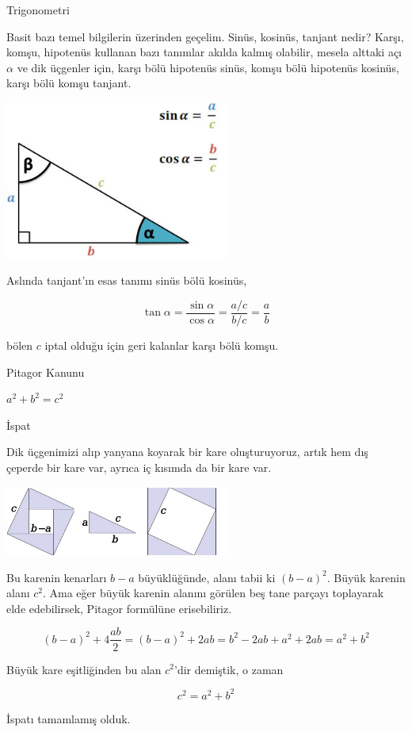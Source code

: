 \documentclass[12pt,fleqn]{article}\usepackage{../../common}
\begin{document}
Trigonometri

Basit bazı temel bilgilerin üzerinden geçelim. Sinüs, kosinüs, tanjant nedir?
Karşı, komşu, hipotenüs kullanan bazı tanımlar akılda kalmış olabilir, mesela
alttaki açı $\alpha$ ve dik üçgenler için, karşı bölü hipotenüs sinüs, komşu
bölü hipotenüs kosinüs, karşı bölü komşu tanjant.

\includegraphics[width=20em]{ode_mattuck_50_trig_04.jpg}

Aslında tanjant'ın esas tanımı sinüs bölü kosinüs,

$$
\tan \alpha = \frac{\sin\alpha}{\cos\alpha} = \frac{a / c}{b / c} = \frac{a}{b}
$$

bölen $c$ iptal olduğu için geri kalanlar karşı bölü komşu. 

Pitagor Kanunu

$a^2 + b^2 = c^2$

İspat

Dik üçgenimizi alıp yanyana koyarak bir kare oluşturuyoruz, artık hem dış
çeperde bir kare var, ayrıca iç kısımda da bir kare var. 

\includegraphics[width=20em]{ode_mattuck_50_trig_01.png}

Bu karenin kenarları $b-a$ büyüklüğünde, alanı tabii ki $(b-a)^2$. Büyük karenin
alanı $c^2$. Ama eğer büyük karenin alanını görülen beş tane parçayı toplayarak
elde edebilirsek, Pitagor formülüne erisebiliriz.

$$
(b-a)^2 + 4 \frac{ab}{2} = (b-a)^2 + 2 ab = b^2 -2ab + a^2 + 2ab = a^2 + b^2
$$

Büyük kare eşitliğinden bu alan $c^2$'dir demiştik, o zaman

$$
c^2 = a^2 + b^2
$$

İspatı tamamlamış olduk.
\end{document}
